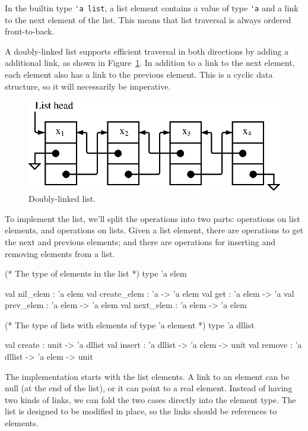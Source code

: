 
In the builtin type \hbox{\lstinline/'a list/}, a list element contains a value of type \hbox{\lstinline/'a/} and
a link to the next element of the list.  This means that list traversal is always ordered front-to-back.

A doubly-linked list supports efficient traversal in both directions by adding a additional link, as
shown in Figure~\ref{figure:dllist1}.  In addition to a link to the next element, each element also
has a link to the previous element.  This is a cyclic data structure, so it will necessarily be
imperative.

\begin{figure}
\centerline{\includegraphics{dllist1}}
\caption{Doubly-linked list.}
\label{figure:dllist1}
\end{figure}

To implement the list, we'll split the operations into two parts: operations on list elements, and
operations on lists.  Given a list element, there are operations to get the next and previous
elements; and there are operations for inserting and removing elements from a list.

\begin{ocaml}
(* The type of elements in the list *)
type 'a elem

val nil_elem    : 'a elem
val create_elem : 'a -> 'a elem
val get         : 'a elem -> 'a
val prev_elem   : 'a elem -> 'a elem
val next_elem   : 'a elem -> 'a elem

(* The type of lists with elements of type 'a element *)
type 'a dllist

val create : unit -> 'a dllist
val insert : 'a dllist -> 'a elem -> unit
val remove : 'a dllist -> 'a elem -> unit
\end{ocaml}
%
The implementation starts with the list elements.  A link to an element can be null (at the end of
the list), or it can point to a real element.  Instead of having two kinds of links, we can fold the
two cases directly into the element type.  The list is designed to be modified in place, so the
links should be references to elements.

